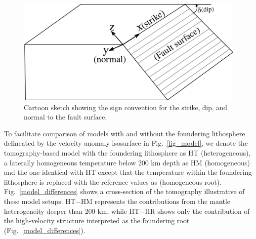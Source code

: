 \documentclass[draft,linenumbers]{agujournal2018}
\begin{document}
\begin{figure}[h!]
    \centering
    \includegraphics[width=0.5\linewidth]{figures/sign_convention.png}
    \caption{Cartoon sketch showing the sign convention for the strike, dip, and normal to the fault surface.}
    \label{signs}
\end{figure}

To facilitate comparison of models with and without the foundering lithosphere delineated by the velocity anomaly isosurface in Fig.~\ref{fig_model}, we denote the tomography-based model with the foundering lithosphere as HT (heterogeneous), a laterally homogeneous temperature below 200 km depth as HM (homogeneous) and the one identical with HT except that the temperature within the foundering lithosphere is replaced with the reference values as (homogeneous root). Fig.~\ref{model_differences} shows a cross-section of the tomography illustrative of these model setups. HT$-$HM represents the contributions from the mantle heterogeneity deeper than 200 km, while HT$-$HR shows only the contribution of the high-velocity structure interpreted as the foundering root (Fig.~\ref{model_differences}).  
\end{document}

